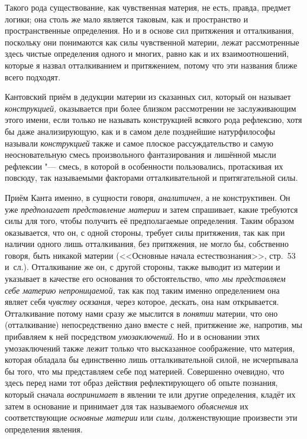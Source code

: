 Такого рода существование, как чувственная материя, не есть, правда, предмет
логики; она столь же мало является таковым, как и пространство и
пространственные определения. Но и в основе сил притяжения и отталкивания,
поскольку они понимаются как силы чувственной материи, лежат рассмотренные
здесь чистые определения одного и многих, равно как и их взаимоотношений,
которые я назвал отталкиванием и притяжением, потому что эти названия ближе
всего подходят.

Кантовский приём в дедукции материи из сказанных сил, который он называет
{\em конструкцией,} оказывается при более близком
рассмотрении не заслуживающим этого имени, если только не называть
конструкцией всякого рода рефлексию, хотя бы даже анализирующую, как и в
самом деле позднейшие натурфилософы называли
{\em конструкцией} также и самое плоское
рассуждательство и самую неосновательную смесь произвольного фантазирования
и лишённой мысли рефлексии "--- смесь, в которой в особенности пользовались,
протаскивая их повсюду, так называемыми факторами отталкивательной и
притягательной силы.

Приём Канта именно, в сущности говоря, {\em аналитичен,}
а не конструктивен. Он уже {\em предполагает
представление материи} и затем спрашивает, какие требуются силы для того,
чтобы получить её предполагаемые определения. Таким образом оказывается,
что он, с одной стороны, требует силы притяжения, так как при наличии
одного лишь отталкивания, без притяжения, не могло бы, собственно говоря,
быть никакой материи (<<Основные начала естествознания>>, стр.~53 и~сл.).
Отталкивание же он, с другой стороны, также выводит из материи и указывает
в качестве его основания то обстоятельство, {\em что мы
представляем себе материю непроницаемой,} так как под таким именно
определением она являет себя {\em чувству осязания,}
через которое, дескать, она нам открывается. Отталкивание потому нами сразу
же мыслится в {\em понятии} материи, что оно
(отталкивание) непосредственно дано вместе с ней, притяжение же, напротив,
мы прибавляем к ней посредством {\em умозаключений}. Но
и в основании этих умозаключений также лежит только что высказанное
соображение, что материя, которая обладала бы единственно лишь
отталкивательной силой, не исчерпывала бы того, что мы представляем себе
под материей. Совершенно очевидно, что здесь перед нами тот образ действия
рефлектирующего об опыте познания, который сначала
{\em воспринимает} в явлении те или другие определения,
кладёт их затем в основание и принимает для так называемого
{\em объяснения} их соответствующие {\em основные материи} или
{\em силы,} долженствующие произвести эти определения явления.

